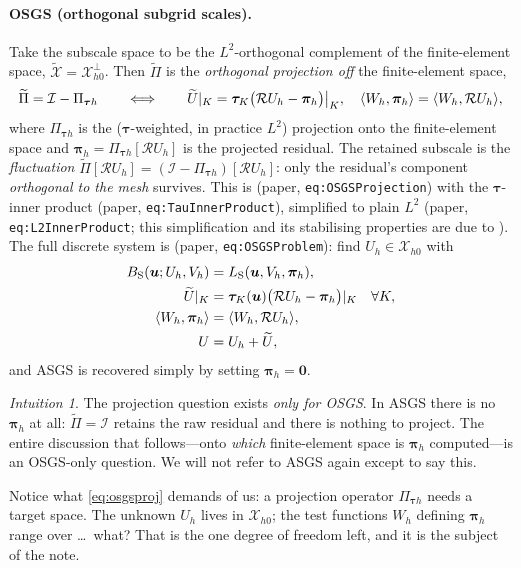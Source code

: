 \documentclass[11pt]{article}
\newcommand{\bu}{\boldsymbol{u}}
\newcommand{\bpi}{\boldsymbol{\pi}}
\newcommand{\bzero}{\boldsymbol{0}}
\DeclarePairedDelimiter{\dualp}{\langle}{\rangle}
\newcommand{\Rop}{\mathcal{R}}
\newcommand{\Xhz}{\mathcal{X}_{h0}}
\newcommand{\Xtil}{\widetilde{\mathcal{X}}}
\newcommand{\Ptauh}{\Pi_{\bm{\tau}h}}
\newcommand{\Ptilde}{\widetilde{\Pi}}
\newcommand{\Uh}{U_{h}}
\newcommand{\Util}{\widetilde{U}}
\theoremstyle{plain}
\theoremstyle{definition}
\theoremstyle{remark}
\newtheorem*{intuition}{Intuition}
\begin{document}
\paragraph{OSGS (orthogonal subgrid scales).}
Take the subscale space to be the $L^2$-orthogonal complement of the
finite-element space, $\Xtil=\Xhz^{\perp}$. Then $\Ptilde$ is the
\emph{orthogonal projection off} the finite-element space,
%
\begin{equation}\label{eq:osgsproj}
  \Ptilde=\mathcal I-\Ptauh
  \qquad\Longleftrightarrow\qquad
  \Util|_K=\bm\tau_K\bigl(\Rop U_h-\bpi_h\bigr)\big|_K,\quad
  \dualp{W_h,\bpi_h}=\dualp{W_h,\Rop U_h},
\end{equation}
%
where $\Ptauh$ is the ($\bm\tau$-weighted, in practice $L^2$)
projection onto the finite-element space and
$\bpi_h=\Ptauh[\Rop U_h]$ is the projected residual. The retained
subscale is the \emph{fluctuation} $\Ptilde[\Rop U_h]=(\mathcal I-\Ptauh)
[\Rop U_h]$: only the residual's component \emph{orthogonal to the
mesh} survives. This is (paper, \texttt{eq:OSGSProjection}) with the
$\bm\tau$-inner product (paper, \texttt{eq:TauInnerProduct}), simplified
to plain $L^2$ (paper, \texttt{eq:L2InnerProduct}; this simplification and
its stabilising properties are due to \cite{codina2002}). The full discrete
system is (paper, \texttt{eq:OSGSProblem}): find $\Uh\in\Xhz$ with
%
\begin{align*}
  B_{\mathrm S}(\bu;\Uh,V_h)&=L_{\mathrm S}(\bu,V_h,\bpi_h),\\
  \Util|_K&=\bm\tau_K(\bu)\bigl(\Rop U_h-\bpi_h\bigr)|_K
      \quad\forall K,\\
  \dualp{W_h,\bpi_h}&=\dualp{W_h,\Rop U_h},\\
  U&=\Uh+\Util,
\end{align*}
%
and ASGS is recovered simply by setting $\bpi_h=\bzero$.

\begin{intuition}
The projection question exists \emph{only for OSGS}. In ASGS there is no
$\bpi_h$ at all: $\Ptilde=\mathcal I$ retains the raw residual and there
is nothing to project. The entire discussion that follows---onto
\emph{which} finite-element space is $\bpi_h$ computed---is an
OSGS-only question. We will not refer to ASGS again except to say this.
\end{intuition}

Notice what \cref{eq:osgsproj} demands of us: a projection operator
$\Ptauh$ needs a target space. The unknown $\Uh$ lives in $\Xhz$; the
test functions $W_h$ defining $\bpi_h$ range over \dots\ what? That is
the one degree of freedom left, and it is the subject of the note.
\end{document}
